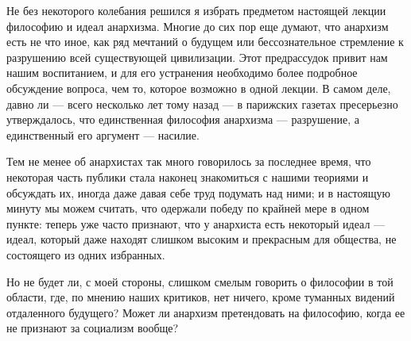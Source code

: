 Не без некоторого колебания решился я избрать предметом настоящей лекции философию и идеал анархизма. Многие до сих пор еще думают, что анархизм есть не что иное, как ряд мечтаний о будущем или бессознательное стремление к разрушению всей существующей цивилизации. Этот предрассудок привит нам нашим воспитанием, и для его устранения необходимо более подробное обсуждение вопроса, чем то, которое возможно в одной лекции. В самом деле, давно ли — всего несколько лет тому назад — в парижских газетах пресерьезно утверждалось, что единственная философия анархизма — разрушение, а единственный его аргумент — насилие.
\par
Тем не менее об анархистах так много говорилось за последнее время, что некоторая часть публики стала наконец знакомиться с нашими теориями и обсуждать их, иногда даже давая себе труд подумать над ними; и в настоящую минуту мы можем считать, что одержали победу по крайней мере в одном пункте: теперь уже часто признают, что у анархиста есть некоторый идеал — идеал, который даже находят слишком высоким и прекрасным для общества, не состоящего из одних избранных.
\par
Но не будет ли, с моей стороны, слишком смелым говорить о философии в той области, где, по мнению наших критиков, нет ничего, кроме туманных видений отдаленного будущего? Может ли анархизм претендовать на философию, когда ее не признают за социализм вообще?
